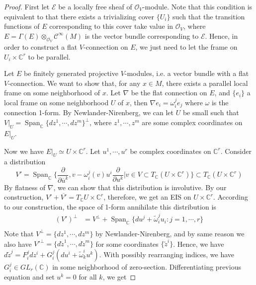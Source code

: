 \documentclass[12pt]{amsart}
\theoremstyle{definition}
\theoremstyle{remark}
\numberwithin{equation}{section}
\newcommand{\del}{\partial}
\renewcommand{\del}{\partial}
\newcommand{\CO}{{\mathcal O}}
\newcommand{\cinf}{{\mathcal C}^{\infty}}
\newcommand{\C}{{\mathbb{C}}}
\newcommand{\1}{{\mathbb{1}}}
\newcommand{\Span}{\operatorname{Span}}
\begin{document}
 \begin{proof}
 First let $\mathcal{E}$ be a locally free sheaf of $\CO_V$-module. Note that this condition is equivalent to that there exists a trivializing cover $\{U_i\}$ such that the transition functions of $E$ corresponding to this cover take value in $\CO_V$, where $E = \Gamma(E)\otimes_{\CO_V}\cinf(M)$ is the vector bundle corresponding to $\mathcal{E}$. Hence, in order to construct a flat $V$-connection on $E$, we just need to let the frame on $U_i\times \C^r$ to be parallel.
 
 
 Let $E$ be finitely generated projective $V$-modules, i.e. a vector bundle with a flat $V$-connection. We want to show that, for any $x\in M$, there exists a parallel local frame on some neighborhood of $x$. Let $\nabla$ be the flat connection on $E$, and $\{e_i\}$ a local frame on some neighborhood $U$ of $x$, then $\nabla e_i = \omega^j_i e_j$ where $\omega$ is the connection 1-form. By Newlander-Nirenberg, we can let $U$ be small such that $V|_U = \Span_{\C}\{dz^1, \cdots, dz^m\}^{\perp}$, where $z^1, \cdots, z^m$ are some complex coordinates on $E|_U$.
 
 Now we have $E|_U \simeq U\times \C^r$. Let $u^1, \cdots, u^r$ be complex coordinates on $\C^r$. Consider a distribution 
 \begin{equation*}
     V'= \Span_{\C} \bigg\{\frac{\del}{\del \overline{u}^k}, v - \omega^j_i(v)u^i\frac{\del}{\del u^k}| v \in V \subset T_{\C}(U\times \C^r)\bigg\}
     \subset T_{\C}(U\times \C^r)
 \end{equation*}
 By flatness of $\nabla$, we can show that this distribution is involutive. By our construction, $V' + \overline{V'} = T_{\C} U\times \C^r$, therefore, we get an EIS on $U\times \C^r$.
 According to our construction, the space of 1-form annihilate this distribution is 
 \begin{align*}
     (V')^{\perp} &= V^{\perp} + \Span_{\C} \{du^j +\tilde{\omega}^j_i u_i: j = 1,\cdots, r \}\\
 \end{align*}
 Note that $V^{\perp} = \{dz^1, \cdots, dz^m\}$ by Newlander-Nirenberg, and by same reason we also have ${V'}^{\perp} = \{d\tilde{z}^1, \cdots, d\tilde{z}^m\}$ for some coordinates $\{\tilde{z}^i\}$. Hence, we have $d\tilde{z}^j = F^j_i dz^i + G^j_i(du^i + \tilde{\omega}^i_k u^k)$. With possibly rearranging indices, we have $G^j_i \in GL_r(\C)$ in some neighborhood of zero-section. Differentiating previous equation and set $u^k = 0$ for all $k$, we get
 

\end{proof}
\end{document}
